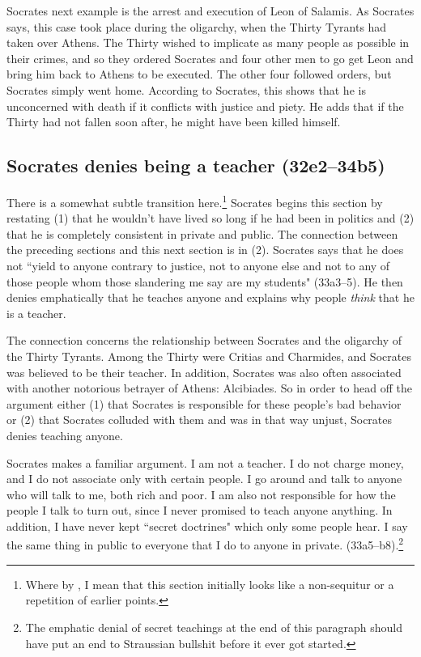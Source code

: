 \documentclass[11pt]{article}
\begin{document}
Socrates next example is the arrest and execution of Leon of Salamis.  As Socrates says, this case took place during the oligarchy, when the Thirty Tyrants had taken over Athens.  The Thirty wished to implicate as many people as possible in their crimes, and so they ordered Socrates and four other men to go get Leon and bring him back to Athens to be executed.  The other four followed orders, but Socrates simply went home.  According to Socrates, this shows that he is unconcerned with death if it conflicts with justice and piety.  He adds that if the Thirty had not fallen soon after, he might have been killed himself.


\subsection{Socrates denies being a teacher (32e2--34b5)}

There is a somewhat subtle transition here.\footnote{Where by , I mean that this section initially looks like a non-sequitur or a repetition of earlier points.}  Socrates begins this section by restating (1) that he wouldn't have lived so long if he had been in politics and (2) that he is completely consistent in private and public.  The connection between the preceding sections and this next section is in (2).  Socrates says that he does not ``yield to anyone contrary to justice, not to anyone else and not to any of those people whom those slandering me say are my students" (33a3--5).  He then denies emphatically that he teaches anyone and explains why people \emph{think} that he is a teacher.

The connection concerns the relationship between Socrates and the oligarchy of the Thirty Tyrants.  Among the Thirty were Critias and Charmides, and Socrates was believed to be their teacher.  In addition, Socrates was also often associated with another notorious betrayer of Athens: Alcibiades.  So in order to head off the argument either (1) that Socrates is responsible for these people's bad behavior or (2) that Socrates colluded with them and was in that way unjust, Socrates denies teaching anyone.

Socrates makes a familiar argument.  I am not a teacher.  I do not charge money, and I do not associate only with certain people.  I go around and talk to anyone who will talk to me, both rich and poor.  I am also not responsible for how the people I talk to turn out, since I never promised to teach anyone anything.  In addition, I have never kept ``secret doctrines" which only some people hear.  I say the same thing in public to everyone that I do to anyone in private. (33a5--b8).\footnote{The emphatic denial of secret teachings at the end of this paragraph should have put an end to Straussian bullshit before it ever got started.}
\end{document}
